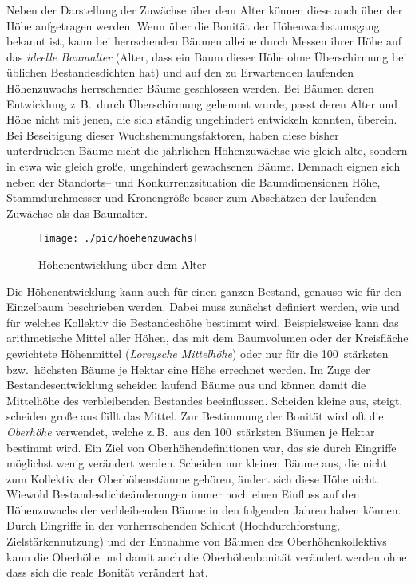 \documentclass[twocolumn]{scrartcl}
\begin{document}
Neben der Darstellung der Zuwächse über dem Alter können diese auch über der
Höhe aufgetragen werden. Wenn über die Bonität der Höhenwachstumsgang bekannt
ist, kann bei herrschenden Bäumen alleine durch Messen ihrer Höhe auf das
\emph{ideelle Baumalter} (Alter, dass ein Baum dieser Höhe ohne Überschirmung
bei üblichen Bestandesdichten hat) und auf den zu Erwartenden laufenden
Höhenzuwachs herrschender Bäume geschlossen werden. Bei Bäumen deren
Entwicklung z.\,B.\ durch Überschirmung gehemmt wurde, passt deren Alter und
Höhe nicht mit jenen, die sich ständig ungehindert entwickeln konnten, überein.
Bei Beseitigung dieser Wuchshemmungsfaktoren, haben diese bisher unterdrückten
Bäume nicht die jährlichen Höhenzuwächse wie gleich alte, sondern in etwa wie
gleich große, ungehindert gewachsenen Bäume. Demnach eignen sich neben der
Standorts-- und Konkurrenzsituation die Baumdimensionen Höhe, Stammdurchmesser
und Kronengröße besser zum Abschätzen der laufenden Zuwächse als das Baumalter.

\begin{figure}[htbp]
  \centering
  \texttt{[image: ./pic/hoehenzuwachs]}
  \caption{Höhenentwicklung über dem Alter}
  \label{fig:hoeheAlter}
\end{figure}

Die Höhenentwicklung kann auch für einen ganzen Bestand, genauso wie für den
Einzelbaum beschrieben werden. Dabei muss zunächst definiert werden, wie und für
welches Kollektiv die Bestandeshöhe bestimmt wird. Beispielsweise kann das
arithmetische Mittel aller Höhen, das mit dem Baumvolumen oder der Kreisfläche
gewichtete Höhenmittel (\emph{Loreysche Mittelhöhe}) oder nur für die
100~stärksten bzw.\ höchsten Bäume je Hektar eine Höhe errechnet werden. Im Zuge
der Bestandesentwicklung scheiden laufend Bäume aus und können damit die
Mittelhöhe des verbleibenden Bestandes beeinflussen. Scheiden kleine aus,
steigt, scheiden große aus fällt das Mittel. Zur Bestimmung der Bonität wird oft
die \emph{Oberhöhe} verwendet, welche z.\,B.\ aus den 100~stärksten Bäumen je
Hektar bestimmt wird. Ein Ziel von Oberhöhendefinitionen war, das sie durch
Eingriffe möglichst wenig verändert werden. Scheiden nur kleinen Bäume aus, die
nicht zum Kollektiv der Oberhöhenstämme gehören, ändert sich diese Höhe nicht.
Wiewohl Bestandesdichteänderungen immer noch einen Einfluss auf den Höhenzuwachs
der verbleibenden Bäume in den folgenden Jahren haben können. Durch Eingriffe in
der vorherrschenden Schicht (Hochdurchforstung, Zielstärkennutzung) und der
Entnahme von Bäumen des Oberhöhenkollektivs kann die Oberhöhe und damit auch die
Oberhöhenbonität verändert werden ohne dass sich die reale Bonität verändert
hat.
\end{document}

